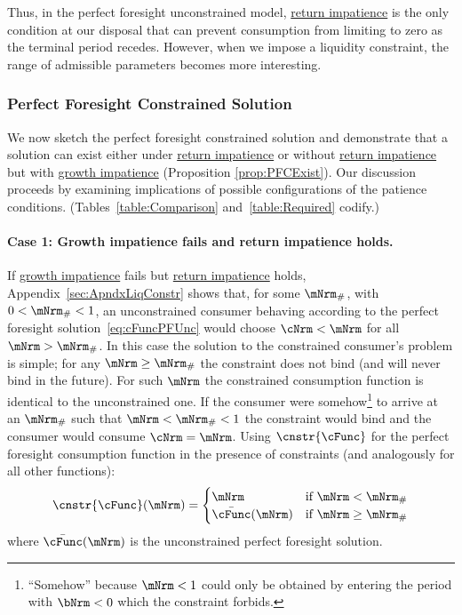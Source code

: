 \documentclass[\econtexRoot/BufferStockTheory]{subfiles}
\begin{document}
Thus, in the perfect foresight unconstrained model, \hyperlink{RIC}{return impatience} is the only condition at our disposal that can prevent consumption from limiting to zero as the terminal period recedes.
However, when we impose a liquidity constraint, the range of admissible parameters becomes more interesting.

\hypertarget{PF-Constrained-Solution}{}
\hypertarget{Constrained-Solution}{}
\subsubsection{Perfect Foresight Constrained Solution}\label{subsec:PFCon}

We now sketch the perfect foresight constrained solution and demonstrate that a solution can exist either under \hyperlink{RIC}{return impatience} or without \hyperlink{RIC}{return impatience} but with \hyperlink{GICRaw}{growth impatience} (Proposition \ref{prop:PFCExist}).
Our discussion proceeds by examining implications of possible configurations of the patience conditions.
(Tables~\ref{table:Comparison} and~\ref{table:Required} codify.)


\paragraph{Case 1: Growth impatience fails and return impatience holds.} If \hyperlink{GICRaw}{growth impatience} fails but \hyperlink{RIC}{return impatience} holds, Appendix~\ref{sec:ApndxLiqConstr} shows that, for some $\mNrm_{\#}$, with $0 < \mNrm_{\#} < 1$, an unconstrained consumer behaving according to the perfect foresight solution~\eqref{eq:cFuncPFUnc} would choose $\cNrm < \mNrm$ for all $\mNrm > \mNrm_{\#}$.
In this case the solution to the constrained consumer's problem is simple; for any $\mNrm \geq \mNrm_{\#}$ the constraint does not bind (and will never bind in the future).
For such $\mNrm$ the constrained consumption function is identical to the unconstrained one.
If the consumer were somehow\footnote{``Somehow'' because $\mNrm<1$ could only be obtained by entering the period with $\bNrm < 0$ which the constraint forbids.} to arrive at an $\mNrm_{\#}$ such that $\mNrm < \mNrm_{\#} < 1$ the constraint would bind and the consumer would consume $\cNrm=\mNrm$.
Using $\cnstr{\cFunc}$ for the perfect foresight consumption function in the presence of constraints  (and analogously for all other functions):
\begin{equation*}
  \cnstr{\cFunc}(\mNrm)=
  \begin{cases}
    \mNrm & \text{if $\mNrm < \mNrm_{\#}$} \\
    \bar{\cFunc}(\mNrm)  & \text{if $\mNrm \geq \mNrm_{\#}$}
  \end{cases}
\end{equation*}
where $\bar{\cFunc}(\mNrm)$ is the unconstrained perfect foresight solution.
\end{document}
